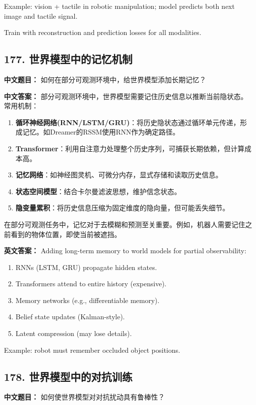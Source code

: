 \documentclass[10pt,a4paper]{ctexart}
\begin{document}
Example: vision + tactile in robotic manipulation; model predicts both next image and tactile signal.

Train with reconstruction and prediction losses for all modalities.

\subsection*{177. 世界模型中的记忆机制}
\textbf{中文题目：} 如何在部分可观测环境中，给世界模型添加长期记忆？

\textbf{中文答案：}  
部分可观测环境中，世界模型需要记住历史信息以推断当前隐状态。常用机制：

\begin{enumerate}
    \item \textbf{循环神经网络(RNN/LSTM/GRU)}：将历史隐状态通过循环单元传递，形成记忆。如Dreamer的RSSM使用RNN作为确定路径。
    \item \textbf{Transformer}：利用自注意力处理整个历史序列，可捕获长期依赖，但计算成本高。
    \item \textbf{记忆网络}：如神经图灵机、可微分内存，显式存储和读取历史信息。
    \item \textbf{状态空间模型}：结合卡尔曼滤波思想，维护信念状态。
    \item \textbf{隐变量累积}：将历史信息压缩为固定维度的隐向量，但可能丢失细节。
\end{enumerate}

在部分可观测任务中，记忆对于去模糊和预测至关重要。例如，机器人需要记住之前看到的物体位置，即使当前被遮挡。

\textbf{英文答案：}  
Adding long-term memory to world models for partial observability:

\begin{enumerate}
    \item RNNs (LSTM, GRU) propagate hidden states.
    \item Transformers attend to entire history (expensive).
    \item Memory networks (e.g., differentiable memory).
    \item Belief state updates (Kalman-style).
    \item Latent compression (may lose details).
\end{enumerate}

Example: robot must remember occluded object positions.

\subsection*{178. 世界模型中的对抗训练}
\textbf{中文题目：} 如何使世界模型对对抗扰动具有鲁棒性？
\end{document}
